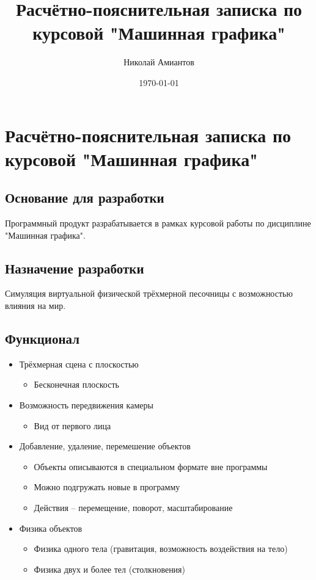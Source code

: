 \documentclass[a4paper,12pt]{article}
\title{Расчётно-пояснительная записка по курсовой "Машинная графика"}
\author{Николай Амиантов}
\date{\today}
\begin{document}
\section{Расчётно-пояснительная записка по курсовой "Машинная графика"}

\subsection{Основание для разработки}

Программный продукт разрабатывается в рамках курсовой работы по дисциплине "Машинная графика".

\subsection{Назначение разработки}

Симуляция виртуальной физической трёхмерной песочницы с возможностью влияния на мир.

\subsection{Функционал}
\begin{itemize}
  \item Трёхмерная сцена с плоскостью
  \begin{itemize}
    \item Бесконечная плоскость
  \end{itemize}
  \item Возможность передвижения камеры
  \begin{itemize}
    \item Вид от первого лица
  \end{itemize}
  \item Добавление, удаление, перемешение объектов
  \begin{itemize}
    \item Объекты описываются в специальном формате вне программы
    \item Можно подгружать новые в программу
    \item Действия -- перемещение, поворот, масштабирование
  \end{itemize}
  \item Физика объектов
  \begin{itemize}
    \item Физика одного тела (гравитация, возможность воздействия на тело)
    \item Физика двух и более тел (столкновения)
  \end{itemize}
\end{itemize}
\end{document}

